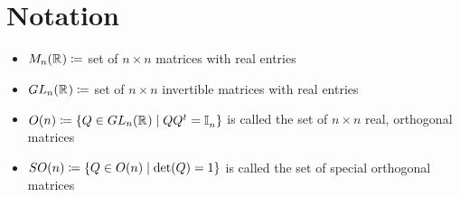 \section{Notation}
\label{s:notation}
\begin{itemize}[label =  $\circ$, leftmargin = *]
\item $M_n(\mathbb{R}^{}) \coloneqq$ set of $n \times n$ matrices with real entries
\item $GL_n(\mathbb{R}^{}) \coloneqq$ set of $n \times n$ invertible matrices with real entries
\item $O(n) \coloneqq \{Q \in GL_n(\mathbb{R}^{}) \mid QQ^{t} = \mathbb{I}^{}_n\}$ is called the set of $n \times n$ real, orthogonal matrices
\item $SO(n) \coloneqq \{Q \in O(n) \mid \mathrm{det}(Q) = 1\}$ is called the set of special orthogonal matrices
\end{itemize}
